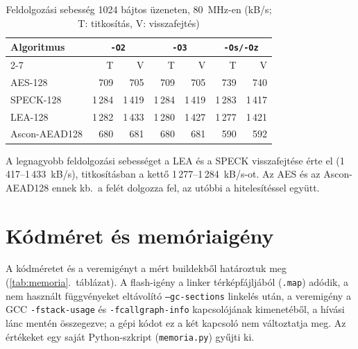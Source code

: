 \documentclass[a4paper,12pt]{report}
\theoremstyle{definition}
\theoremstyle{remark}
\begin{document}
\begin{table}[htbp]
    \centering
    \small
    \caption{Feldolgozási sebesség 1024 bájtos üzeneten, 80~MHz-en (kB/s; T: titkosítás, V: visszafejtés)}
    \label{tab:throughput}
    \begin{tabular}{|l|r|r|r|r|r|r|}
        \hline
        \textbf{Algoritmus} & \multicolumn{2}{c|}{\textbf{\texttt{-O2}}} & \multicolumn{2}{c|}{\textbf{\texttt{-O3}}} & \multicolumn{2}{c|}{\textbf{\texttt{-Os/-Oz}}} \\ \cline{2-7}
        & T & V & T & V & T & V \\ \hline
        AES-128       & 709    & 705    & 709    & 705    & 739    & 740    \\ \hline
        SPECK-128     & 1\,284 & 1\,419 & 1\,284 & 1\,419 & 1\,283 & 1\,417 \\ \hline
        LEA-128       & 1\,282 & 1\,433 & 1\,280 & 1\,427 & 1\,277 & 1\,421 \\ \hline
        Ascon-AEAD128 & 680    & 681    & 680    & 681    & 590    & 592    \\ \hline
    \end{tabular}
\end{table}

A legnagyobb feldolgozási sebességet a LEA és a SPECK visszafejtése érte el (1\,417--1\,433~kB/s), titkosításban a kettő 1\,277--1\,284~kB/s-ot. Az AES és az Ascon-AEAD128 ennek kb.\ a felét dolgozza fel, az utóbbi a hitelesítéssel együtt.

\section{Kódméret és memóriaigény}\label{sec:memoria}

A kódméretet és a veremigényt a mért buildekből határoztuk meg (\ref{tab:memoria}.~táblázat). A flash-igény a linker térképfájljából (\texttt{.map}) adódik, a nem használt függvényeket eltávolító \texttt{--gc-sections} linkelés után, a veremigény a GCC \texttt{-fstack-usage} és \texttt{-fcallgraph-info} kapcsolójának kimenetéből, a hívási lánc mentén összegezve; a gépi kódot ez a két kapcsoló nem változtatja meg. Az értékeket egy saját Python-szkript (\texttt{memoria.py}) gyűjti ki.
\end{document}
